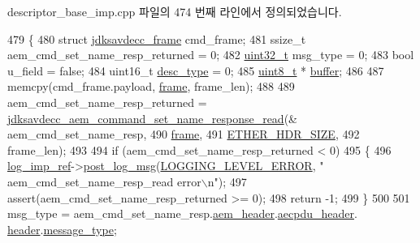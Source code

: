 descriptor\+\_\+base\+\_\+imp.\+cpp 파일의 474 번째 라인에서 정의되었습니다.


\begin{DoxyCode}
479 \{
480     \textcolor{keyword}{struct }\hyperlink{structjdksavdecc__frame}{jdksavdecc\_frame} cmd\_frame;
481     ssize\_t aem\_cmd\_set\_name\_resp\_returned = 0;
482     \hyperlink{parse_8c_a6eb1e68cc391dd753bc8ce896dbb8315}{uint32\_t} msg\_type = 0;
483     \textcolor{keywordtype}{bool} u\_field = \textcolor{keyword}{false};
484     uint16\_t \hyperlink{classavdecc__lib_1_1descriptor__base__imp_a9dada313309522d04f1e52fe887442b4}{desc\_type} = 0;
485     \hyperlink{stdint_8h_aba7bc1797add20fe3efdf37ced1182c5}{uint8\_t} * \hyperlink{_hello_test_8cpp_a8be6d469a7cd1c8d66cc6d2d1e10c65b}{buffer};
486 
487     memcpy(cmd\_frame.payload, \hyperlink{gst__avb__playbin_8c_ac8e710e0b5e994c0545d75d69868c6f0}{frame}, frame\_len);
488 
489     aem\_cmd\_set\_name\_resp\_returned = 
      \hyperlink{group__command__set__name__response_gaef863bcb2206bfcbd21e95fe8f59869d}{jdksavdecc\_aem\_command\_set\_name\_response\_read}(&
      aem\_cmd\_set\_name\_resp,
490                                                                                    
      \hyperlink{gst__avb__playbin_8c_ac8e710e0b5e994c0545d75d69868c6f0}{frame},
491                                                                                    
      \hyperlink{namespaceavdecc__lib_a6c827b1a0d973e18119c5e3da518e65ca9512ad9b34302ba7048d88197e0a2dc0}{ETHER\_HDR\_SIZE},
492                                                                                    frame\_len);
493 
494     \textcolor{keywordflow}{if} (aem\_cmd\_set\_name\_resp\_returned < 0)
495     \{
496         \hyperlink{namespaceavdecc__lib_acbe3e2a96ae6524943ca532c87a28529}{log\_imp\_ref}->\hyperlink{classavdecc__lib_1_1log_a68139a6297697e4ccebf36ccfd02e44a}{post\_log\_msg}(\hyperlink{namespaceavdecc__lib_a501055c431e6872ef46f252ad13f85cdaf2c4481208273451a6f5c7bb9770ec8a}{LOGGING\_LEVEL\_ERROR}, \textcolor{stringliteral}{"
      aem\_cmd\_set\_name\_resp\_read error\(\backslash\)n"});
497         assert(aem\_cmd\_set\_name\_resp\_returned >= 0);
498         \textcolor{keywordflow}{return} -1;
499     \}
500 
501     msg\_type = aem\_cmd\_set\_name\_resp.\hyperlink{structjdksavdecc__aem__command__set__name__response_ae1e77ccb75ff5021ad923221eab38294}{aem\_header}.\hyperlink{structjdksavdecc__aecpdu__aem_ae8460ae179666e7ce268ed1ef33d0de3}{aecpdu\_header}.
      \hyperlink{structjdksavdecc__aecpdu__common_a314cacb6a61bcf18749030c0b6fb7510}{header}.\hyperlink{structjdksavdecc__aecpdu__common__control__header_aeaaffeace8c23899e558022f62ce6de4}{message\_type};

\end{DoxyCode}

